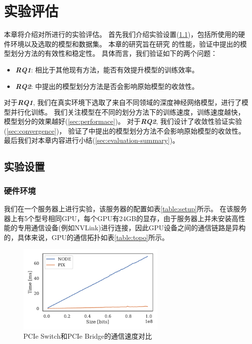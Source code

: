 
\chapter{实验评估}
\label{sec:evaluation}

本章将介绍对\sys{}所进行的实验评估。
首先我们介绍实验设置(\ref{sec:setup})，包括所使用的硬件环境以及选取的模型和数据集。
本章的研究旨在研究 \sys{} 的性能，验证\sys{}中提出的模型划分方法的有效性和稳定性。
具体而言，我们验证如下的两个问题：
\begin{itemize}
	\item \textbf{\textit{RQ1}}: 相比于其他现有方法，\sys{}能否有效提升模型的训练效率。
	\item \textbf{\textit{RQ2}}: \sys{}中提出的模型划分方法是否会影响原始模型的收敛性。
\end{itemize}

对于\textbf{\textit{RQ1}}, 我们在真实环境下选取了来自不同领域的深度神经网络模型，进行了模型并行化训练。
我们关注模型在不同的划分方法下的训练速度，训练速度越快，模型划分的效果越好(\ref{sec:performace})。
对于\textbf{\textit{RQ2}}, 我们设计了收敛性验证实验(\ref{sec:convergence})， 验证了\sys{}中提出的模型划分方法不会影响原始模型的收敛性。
最后我们对本章内容进行小结(\ref{sec:evaluation-summary})。

\section{实验设置}
\label{sec:setup}
\subsection{硬件环境}
\label{sec:hardware}

我们在一个服务器上进行实验，该服务器的配置如表\ref{table:setup}所示。
在该服务器上有5个型号相同GPU，每个GPU有24GB的显存，由于服务器上并未安装高性能的专用通信设备(例如NVLink)进行连接，因此GPU设备之间的通信链路是异构的，具体来说，GPU的通信拓扑如表\ref{table:topo}所示。





\begin{figure}[h]
	\centering
	\includegraphics[width=0.65\textwidth]{./figure/5-evaluation/pix-vs-node.pdf}
	\caption{PCIe Switch和PCIe Bridge的通信速度对比}
	\label{fig:switch-vs-bridge}
\end{figure}

